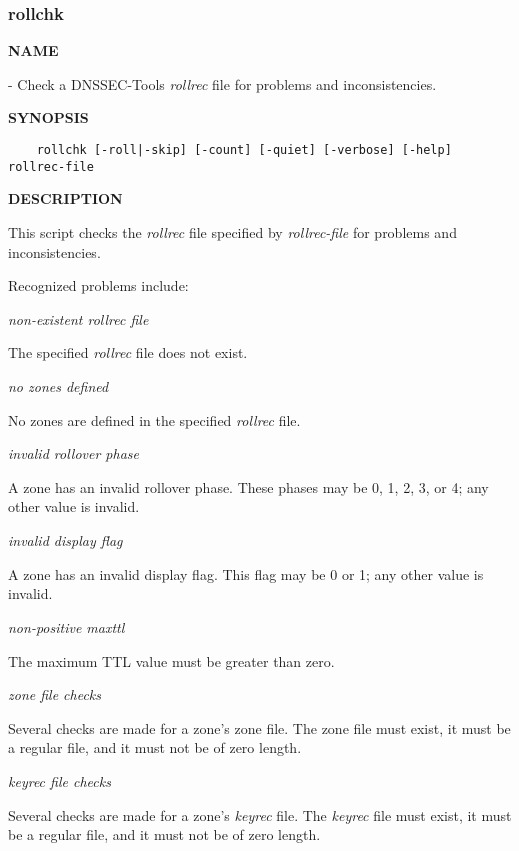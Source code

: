 \clearpage

\subsubsection{\bf rollchk}

{\bf NAME}

 - Check a DNSSEC-Tools {\it rollrec} file for problems and
inconsistencies.

{\bf SYNOPSIS}

\begin{verbatim}
    rollchk [-roll|-skip] [-count] [-quiet] [-verbose] [-help] rollrec-file
\end{verbatim}

{\bf DESCRIPTION}

This script checks the {\it rollrec} file specified by {\it rollrec-file} for
problems and inconsistencies.

Recognized problems include:

\begin{description}

\item {\it non-existent rollrec file}\verb" "

The specified {\it rollrec} file does not exist.

\item {\it no zones defined}\verb" "

No zones are defined in the specified {\it rollrec} file.

\item {\it invalid rollover phase}\verb" "

A zone has an invalid rollover phase.  These phases may be 0, 1, 2, 3, or 4;
any other value is invalid.

\item {\it invalid display flag}\verb" "

A zone has an invalid display flag.  This flag may be 0 or 1;
any other value is invalid.

\item {\it non-positive maxttl}\verb" "

The maximum TTL value must be greater than zero.

\item {\it zone file checks}\verb" "

Several checks are made for a zone's zone file.  The zone file must exist, it
must be a regular file, and it must not be of zero length.

\item {\it keyrec file checks}\verb" "

Several checks are made for a zone's {\it keyrec} file.  The {\it keyrec} file
must exist, it must be a regular file, and it must not be of zero length.

\end{description}


